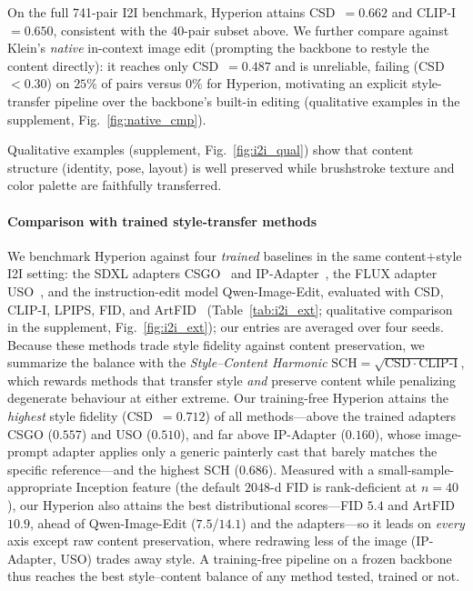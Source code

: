On the full 741-pair I2I benchmark, Hyperion attains CSD~$= 0.662$ and
CLIP-I~$= 0.650$, consistent with the 40-pair subset above.
We further compare against Klein's \emph{native} in-context image edit
(prompting the backbone to restyle the content directly): it reaches only
CSD~$= 0.487$ and is unreliable, failing (CSD~$< 0.30$) on $25\%$ of pairs
versus $0\%$ for Hyperion, motivating an explicit style-transfer pipeline over
the backbone's built-in editing (qualitative examples in the supplement,
Fig.~\ref{fig:native_cmp}).

Qualitative examples (supplement, Fig.~\ref{fig:i2i_qual}) show that content
structure (identity, pose, layout) is well preserved while brushstroke
texture and color palette are faithfully transferred.

\paragraph{Comparison with trained style-transfer methods}
We benchmark Hyperion against four \emph{trained} baselines in the same
content$+$style I2I setting: the SDXL adapters CSGO~\cite{xing2024csgo} and
IP-Adapter~\cite{ipadapter2023}, the FLUX adapter USO~\cite{wu2025uso}, and the
instruction-edit model Qwen-Image-Edit, evaluated with CSD, CLIP-I, LPIPS,
FID, and ArtFID~\cite{wright2022artfid} (Table~\ref{tab:i2i_ext}; qualitative
comparison in the supplement, Fig.~\ref{fig:i2i_ext}); our entries are averaged
over four seeds. Because these methods trade style fidelity against content
preservation, we summarize the balance with the \emph{Style--Content Harmonic}
$\mathrm{SCH}=\sqrt{\mathrm{CSD}\cdot\mathrm{CLIP\text{-}I}}$, which rewards
methods that transfer style \emph{and} preserve content while penalizing
degenerate behaviour at either extreme.
Our training-free Hyperion attains the \emph{highest} style fidelity
(CSD~$=0.712$) of all methods---above the trained adapters CSGO ($0.557$) and
USO ($0.510$), and far above IP-Adapter ($0.160$), whose image-prompt adapter
applies only a generic painterly cast that barely matches the specific
reference---and the highest SCH ($0.686$).
Measured with a small-sample-appropriate Inception feature (the default
$2048$-d FID is rank-deficient at $n{=}40$), our Hyperion also attains the best
distributional scores---FID $5.4$ and ArtFID $10.9$, ahead of Qwen-Image-Edit
($7.5$/$14.1$) and the adapters---so it leads on \emph{every} axis except raw
content preservation, where redrawing less of the image (IP-Adapter, USO) trades
away style. A training-free pipeline on a frozen backbone thus reaches the best
style--content balance of any method tested, trained or not.

